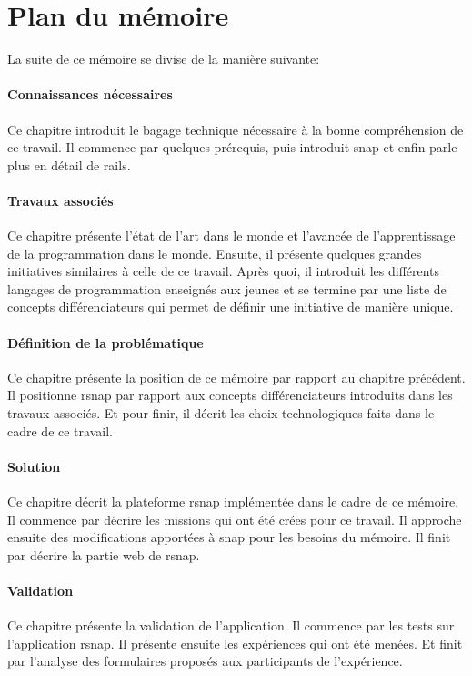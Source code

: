 \section{Plan du mémoire}
La suite de ce mémoire se divise de la manière suivante:

\paragraph{Connaissances nécessaires}
Ce chapitre introduit le bagage technique nécessaire à la bonne compréhension de ce travail. Il commence par quelques prérequis, puis introduit \gls{snap} et enfin parle plus en détail de \gls{rails}.

\paragraph{Travaux associés}
Ce chapitre présente l'état de l'art dans le monde et l'avancée de l'apprentissage de la programmation dans le monde. Ensuite, il présente quelques grandes initiatives similaires à celle de ce travail. Après quoi, il introduit les différents langages de programmation enseignés aux jeunes et se termine par une liste de concepts différenciateurs qui permet de définir une initiative de manière unique.

\paragraph{Définition de la problématique}
Ce chapitre présente la position de ce mémoire par rapport au chapitre précédent. Il positionne \gls{rsnap} par rapport aux concepts différenciateurs introduits dans les travaux associés. Et pour finir, il décrit les choix technologiques faits dans le cadre de ce travail.

\paragraph{Solution}
Ce chapitre décrit la plateforme \gls{rsnap} implémentée dans le cadre de ce mémoire.
Il commence par décrire les \glspl{mission} qui ont été crées pour ce travail. Il approche ensuite des modifications apportées à \gls{snap} pour les besoins du mémoire. Il finit par décrire la partie web de \gls{rsnap}.

\paragraph{Validation}
Ce chapitre présente la validation de l'application. Il commence par les tests sur l'application \gls{rsnap}. Il présente ensuite les expériences qui ont été menées. Et finit par l'analyse des formulaires proposés aux participants de l'expérience.

